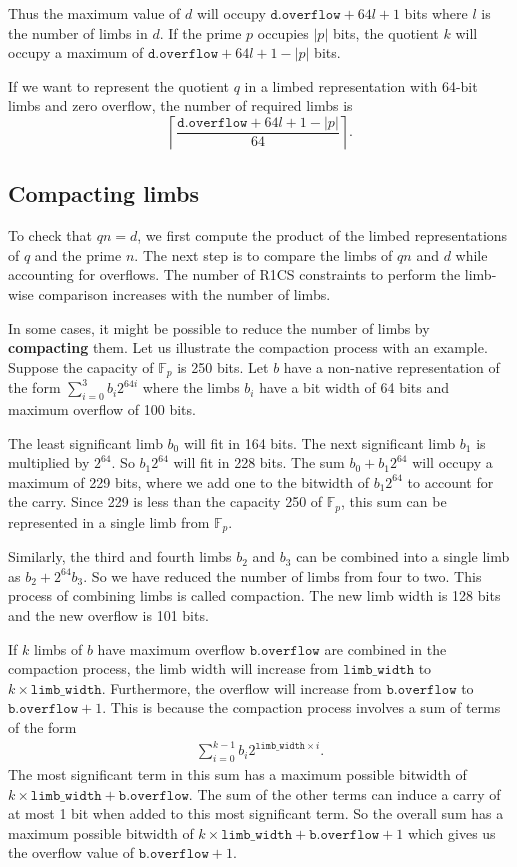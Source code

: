 \documentclass[a4paper, 12pt]{article}
\begin{document}
Thus the maximum value of $d$ will occupy $\texttt{d.overflow}+64l+1$ bits where $l$ is the number of limbs in $d$. If the prime $p$ occupies $|p|$ bits, the quotient $k$ will occupy a maximum of $\texttt{d.overflow}+64l+1 -|p|$ bits.

If we want to represent the quotient $q$  in a limbed representation with 64-bit limbs and zero overflow, the number of required limbs is
$$\left\lceil \frac{\texttt{d.overflow}+64l+1 -|p|}{64}\right\rceil.$$

\subsection{Compacting limbs}
To check that $qn = d$, we first compute the product of the limbed representations of $q$ and the prime $n$. The next step is to compare the limbs of $qn$ and $d$ while accounting for overflows. The number of R1CS constraints to perform the limb-wise comparison increases with the number of limbs.

In some cases, it might be possible to reduce the number of limbs by \textbf{compacting} them. Let us illustrate the compaction process with an example. Suppose the capacity of $\mathbb{F}_p$ is 250 bits. Let $b$ have a non-native representation of the form $\sum_{i=0}^3 b_i 2^{64i}$ where the limbs $b_i$ have a bit width of 64 bits and maximum overflow of 100 bits.

The least significant limb $b_0$ will fit in 164 bits. The next significant limb $b_1$ is multiplied by $2^{64}$. So $b_1 2^{64}$ will fit in 228 bits. The sum $b_0 + b_1 2^{64}$ will occupy a maximum of 229 bits, where we add one to the bitwidth of $b_1 2^{64}$ to account for the carry. Since 229 is less than the capacity 250 of $\mathbb{F}_p$, this sum can be represented in a single limb from $\mathbb{F}_p$.

Similarly, the third and fourth limbs $b_2$ and $b_3$ can be combined into a single limb as $b_2 + 2^{64} b_3$. So we have reduced the number of limbs from four to two. This process of combining limbs is called compaction. The new limb width is 128 bits and the new overflow is 101 bits.

If $k$ limbs of $b$ have maximum overflow $\texttt{b.overflow}$ are combined in the compaction process, the limb width will increase from $\texttt{limb\_width}$ to $k \times \texttt{limb\_width}$. 
Furthermore, the overflow will increase from $\texttt{b.overflow}$ to $\texttt{b.overflow} + 1$. This is because the compaction process involves a sum of terms of the form
\begin{align*}
  \sum_{i=0}^{k-1} b_i 2^{\texttt{limb\_width} \times i}.
\end{align*}
The most significant term in this sum has a maximum possible bitwidth of $k\times \texttt{limb\_width} + \texttt{b.overflow}$. The sum of the other terms can induce a carry of at most 1 bit when added to this most significant term. So the overall sum has a maximum possible bitwidth of $k\times \texttt{limb\_width} + \texttt{b.overflow}+1$ which gives us the overflow value of $\texttt{b.overflow} + 1$.
\end{document}
